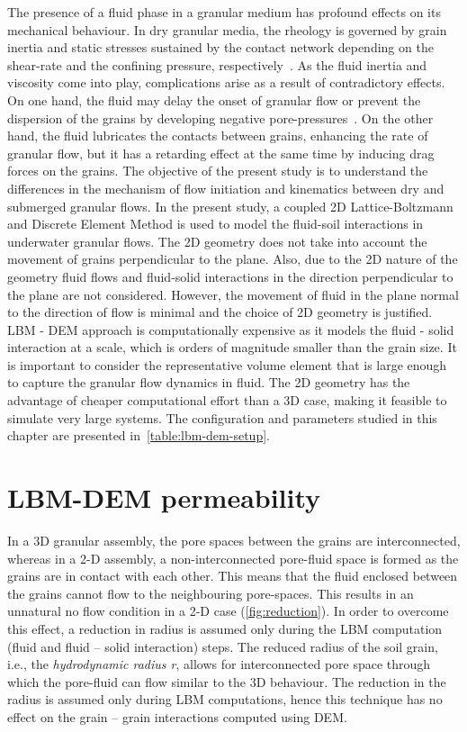 The presence of a fluid phase in a granular medium has profound effects on its 
mechanical behaviour. In dry granular media, the rheology is governed by grain 
inertia and static stresses sustained by the contact network depending on the 
shear-rate and the confining pressure, respectively~\citep{Midi2004}. As the 
fluid inertia and viscosity come into play, complications arise as a result of 
contradictory effects. On one hand, the fluid may delay the onset of
granular flow or prevent the dispersion of the grains by
developing negative pore-pressures~\citep{Pailha2008,Topin2011}. On the other
hand, the fluid lubricates the contacts between grains, enhancing the rate of 
granular flow, but it has a retarding effect at the same time by 
inducing drag forces on the grains. The objective of the present study is to 
understand the differences in the mechanism of flow initiation and kinematics 
between dry and submerged granular flows. In the present study, a coupled 2D 
Lattice-Boltzmann and Discrete Element Method is used to model the fluid-soil 
interactions in  underwater granular flows. The 2D geometry does not take into 
account the movement of grains perpendicular to the plane. Also, due to the 2D 
nature of the geometry fluid flows and fluid-solid interactions in the 
direction perpendicular to the plane are not considered. However, the movement 
of fluid in the plane normal to the direction of flow is minimal and the choice 
of 2D geometry is justified. LBM - DEM approach is computationally expensive as 
it models the fluid - solid interaction at a scale, which is orders of 
magnitude smaller than the grain size. It is important to consider the 
representative volume element that is large enough to capture the granular flow 
dynamics in fluid. The 2D geometry has the advantage of 
cheaper computational effort than a 3D case, making it feasible to simulate 
very large systems. The configuration and parameters studied in this chapter 
are presented 
in~\cref{table:lbm-dem-setup}.



\section{LBM-DEM permeability}

In a 3D granular assembly, the pore spaces between the grains are 
interconnected, whereas in a 2-D assembly, a non-interconnected pore-fluid 
space is formed as the grains are in contact with each 
other. This means that the fluid enclosed between the grains cannot flow 
to the neighbouring pore-spaces.  This results in an unnatural no flow 
condition in a 2-D case (\cref{fig:reduction}). In order to overcome this 
effect, a reduction in radius is assumed only during the LBM computation (fluid 
and fluid – solid interaction) steps. The reduced radius of the soil grain, 
i.e., the \textit{hydrodynamic radius r}, allows for interconnected pore space 
through which the pore-fluid can flow similar to the 3D behaviour. The 
reduction in the radius is assumed only during LBM computations, hence this 
technique has no effect on the grain – grain interactions computed using DEM. 



